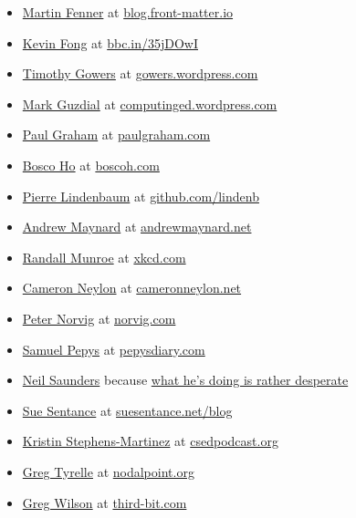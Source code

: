 \documentclass[
]{book}
\begin{document}
\begin{itemize}
\item
  \href{https://twitter.com/mfenner}{Martin Fenner} at \href{https://blog.front-matter.io/}{blog.front-matter.io}
\item
  \href{https://en.wikipedia.org/wiki/Kevin_Fong}{Kevin Fong} at \href{https://bbc.in/35jDOwI}{bbc.in/35jDOwI}
\item
  \href{https://en.wikipedia.org/wiki/Timothy_Gowers}{Timothy Gowers} at \href{https://gowers.wordpress.com/}{gowers.wordpress.com}
\item
  \href{https://en.wikipedia.org/wiki/Mark_Guzdial}{Mark Guzdial} at \href{https://computinged.wordpress.com/}{computinged.wordpress.com}
\item
  \href{https://en.wikipedia.org/wiki/Paul_Graham_(programmer)}{Paul Graham} at \href{http://paulgraham.com/}{paulgraham.com}
\item
  \href{https://twitter.com/boscoh}{Bosco Ho} at \href{https://boscoh.com/}{boscoh.com}
\item
  \href{https://twitter.com/yokofakun}{Pierre Lindenbaum} at \href{https://github.com/lindenb}{github.com/lindenb}
\item
  \href{https://en.wikipedia.org/wiki/Andrew_D._Maynard}{Andrew Maynard} at \href{https://andrewmaynard.net}{andrewmaynard.net}
\item
  \href{https://en.wikipedia.org/wiki/Randall_Munroe}{Randall Munroe} at \href{https://xkcd.com/}{xkcd.com}
\item
  \href{https://en.wikipedia.org/wiki/Cameron_Neylon}{Cameron Neylon} at \href{http://cameronneylon.net/}{cameronneylon.net}
\item
  \href{https://en.wikipedia.org/wiki/Peter_Norvig}{Peter Norvig} at \href{https://norvig.com/}{norvig.com}
\item
  \href{https://en.wikipedia.org/wiki/Samuel_Pepys}{Samuel Pepys} at \href{https://www.pepysdiary.com/}{pepysdiary.com}
\item
  \href{https://twitter.com/neilfws}{Neil Saunders} because \href{https://nsaunders.wordpress.com/blog/}{what he's doing is rather desperate}
\item
  \href{https://en.wikipedia.org/wiki/Sue_Sentance}{Sue Sentance} at \href{https://suesentance.net/blog/}{suesentance.net/blog}
\item
  \href{https://users.cs.duke.edu/~ksm/}{Kristin Stephens-Martinez} at \href{https://csedpodcast.org/}{csedpodcast.org}
\item
  \href{http://tyrelle.net/}{Greg Tyrelle} at \href{https://web.archive.org/web/20050616015629/http://www.nodalpoint.org/}{nodalpoint.org}
\item
  \href{https://twitter.com/gvwilson}{Greg Wilson} at \href{https://third-bit.com/}{third-bit.com}
\end{itemize}
\end{document}

